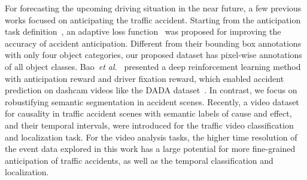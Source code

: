 \documentclass[journal]{IEEEtran}
\begin{document}
For forecasting the upcoming driving situation in the near future, a few previous works focused on anticipating the traffic accident. Starting from the anticipation task definition~\cite{chan2016anticipating}, an adaptive loss function~\cite{suzuki2018anticipating_loss} was proposed for improving the accuracy of accident anticipation. Different from their bounding box annotations with only four object categories, our proposed dataset has pixel-wise annotations of all  object classes. Bao~\textit{et al.}~\cite{bao2021drive} presented a deep reinforcement learning method with anticipation reward and driver fixation reward, which enabled accident prediction on dashcam videos like the DADA dataset~\cite{FangDADA}. In contrast, we focus on robustifying semantic segmentation in accident scenes. Recently, a video dataset~\cite{you2020traffic_accident_benchmark} for causality in traffic accident scenes with semantic labels of cause and effect, and their temporal intervals, were introduced for the traffic video classification and localization task. For the video analysis tasks, the higher time resolution of the event data explored in this work has a large potential for more fine-grained anticipation of traffic accidents, as well as the temporal classification and localization. 
\end{document}
